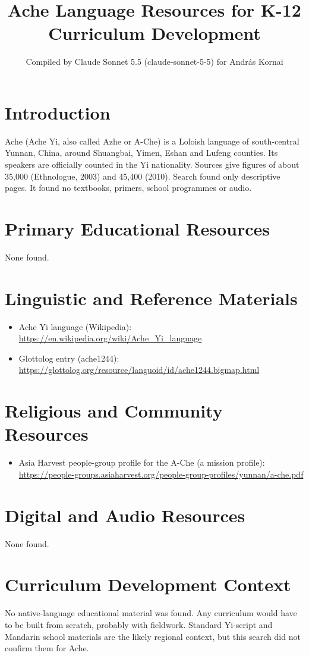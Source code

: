 \documentclass[12pt]{article}
\title{Ache Language Resources for K-12 Curriculum Development}
\author{Compiled by Claude Sonnet 5.5 (claude-sonnet-5-5) for Andr\'as Kornai}
\date{}
\begin{document}
\maketitle

\section{Introduction}
Ache (Ache Yi, also called Azhe or A-Che) is a Loloish language of south-central Yunnan, China, around Shuangbai, Yimen, Eshan and Lufeng counties. Its speakers are officially counted in the Yi nationality. Sources give figures of about 35,000 (Ethnologue, 2003) and 45,400 (2010). Search found only descriptive pages. It found no textbooks, primers, school programmes or audio.

\section{Primary Educational Resources}
None found.

\section{Linguistic and Reference Materials}
\begin{itemize}
\item Ache Yi language (Wikipedia): \url{https://en.wikipedia.org/wiki/Ache_Yi_language}
\item Glottolog entry (ache1244): \url{https://glottolog.org/resource/languoid/id/ache1244.bigmap.html}
\end{itemize}

\section{Religious and Community Resources}
\begin{itemize}
\item Asia Harvest people-group profile for the A-Che (a mission profile): \url{https://people-groups.asiaharvest.org/people-group-profiles/yunnan/a-che.pdf}
\end{itemize}

\section{Digital and Audio Resources}
None found.

\section{Curriculum Development Context}
No native-language educational material was found. Any curriculum would have to be built from scratch, probably with fieldwork. Standard Yi-script and Mandarin school materials are the likely regional context, but this search did not confirm them for Ache.
\end{document}

